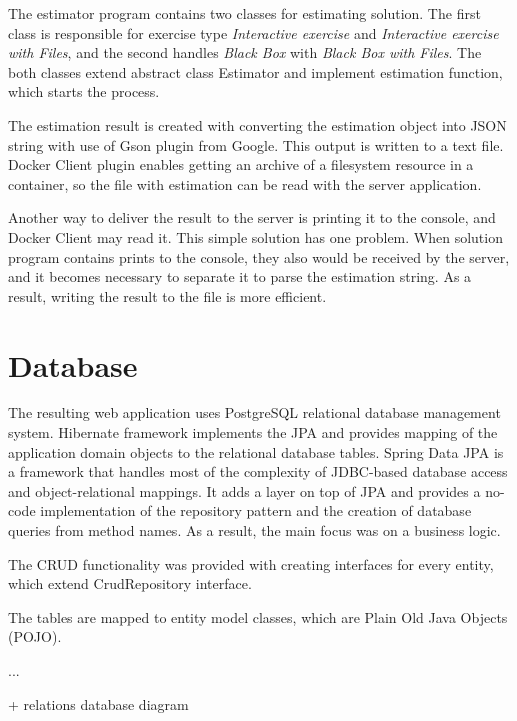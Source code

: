 The estimator program contains two classes for estimating solution. The first class is responsible for exercise type \textit{Interactive exercise} and \textit{Interactive exercise with Files}, and the second handles \textit{Black Box} with \textit{Black Box with Files}. The both classes extend abstract class Estimator and implement estimation function, which starts the process.

The estimation result is created with converting the estimation object into JSON string with use of Gson plugin from Google. This output is written to a text file. Docker Client plugin enables getting an archive of a filesystem resource in a container, so the file with estimation can be read with the server application.

Another way to deliver the result to the server is printing it to the console, and Docker Client may read it. This simple solution has one problem. When solution program contains prints to the console, they also would be received by the server, and it becomes necessary to separate it to parse the estimation string. As a result, writing the result to the file is more efficient.


\section{Database}
The resulting web application uses PostgreSQL relational database management system. Hibernate framework implements the JPA and provides mapping of the application domain objects to the relational database tables. Spring Data JPA is a framework that handles most of the complexity of JDBC-based database access and object-relational mappings. It adds a layer on top of JPA and provides a no-code implementation of the repository pattern and the creation of database queries from method names. As a result, the main focus was on a business logic.

The CRUD functionality was provided with creating interfaces for every entity, which extend CrudRepository interface.

The tables are mapped to entity model classes, which are Plain Old Java Objects (POJO). 

...

+ relations database diagram


